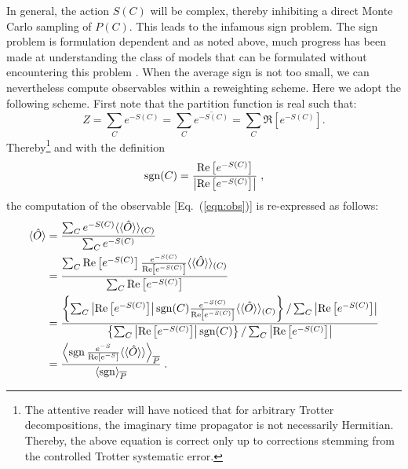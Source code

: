 In general, the action  $S(C) $ will be complex, thereby inhibiting a direct Monte Carlo sampling of $P(C)$.   This leads to the infamous sign problem.     The sign problem is formulation dependent and as noted above, much progress has been made at understanding the class of models that  can be formulated without encountering this problem 
\cite{Wu04,Huffman14,Yao14a,Wei16}.  When the average sign is not too small, we can nevertheless  compute observables within a reweighting scheme.   Here we adopt the following scheme. First  note  that the partition function is real such that: 
\begin{equation}
	Z =   \sum_{C}  e^{-S(C)}    =  \sum_{C}  \overline{e^{-S(C)}} = \sum_{C}  \Re \left[e^{-S(C)} \right]. 
\end{equation}
Thereby\footnote{The attentive reader will have noticed that   for arbitrary Trotter decompositions,  the  imaginary time propagator is not necessarily Hermitian. Thereby, the above equation is correct only up to corrections stemming from the  controlled Trotter systematic error. }
and with the definition
\begin{equation}
\label{Sign.eq}
	 \operatorname{sgn}(C)   =  \frac{   \operatorname{Re} \left[e^{-S(C)} \right]  } {\left| \operatorname{Re} \left[e^{-S(C)} \right]  \right|  }\;,
\end{equation}
the computation of the observable [Eq.~(\ref{eqn:obs})] is re-expressed as follows:
\begin{align}\label{eqn:obs_rw}
\langle \hat{O}  \rangle  &=  \frac{\sum_{C}  e^{-S(C)} \langle \langle \hat{O}  \rangle \rangle_{(C)} }{\sum_{C}  e^{-S(C)}}       \nonumber \\ 
                          &=  \frac{\sum_{C}   \operatorname{Re} \left[e^{-S(C)} \right]    \frac{e^{-S(C)}} {\operatorname{Re} \left[e^{-S(C)} \right]}  \langle \langle \hat{O}  \rangle \rangle_{(C)} }{\sum_{C}   \operatorname{Re} \left[e^{-S(C)} \right]}    \nonumber \\ 
          &=
   \frac{
     \left\{
      \sum_{C}  \left| \operatorname{Re} \left[e^{-S(C)} \right]  \right|   \operatorname{sgn}(C)   \frac{e^{-S(C)}} {\operatorname{Re} \left[e^{-S(C)} \right]}  \langle \langle \hat{O}  \rangle \rangle_{(C)}  \right\}/
            \sum_{C}  \left| \operatorname{Re} \left[ e^{-S(C)} \right] \right|  
          }  
          { 
          \left\{ \sum_{C}  \left|  \operatorname{Re} \left[ e^{-S(C)} \right]   \right|   \operatorname{sgn}(C) \right\}/
            \sum_{C}   \left| \operatorname{Re} \left[ e^{-S(C)} \right] \right|  
          } \nonumber\\
          &=
  	 \frac{  \left\langle  \operatorname{sgn}   \frac{e^{-S}} {\operatorname{Re} \left[e^{-S} \right]}  \langle \langle \hat{O}  \rangle \rangle  \right\rangle_{\overline{P}} } { \langle \operatorname{sgn} \rangle_{\overline{P}}}  \;.      
\end{align} 
